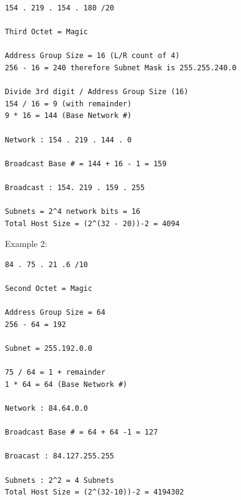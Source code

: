 \begin{lstlisting}
154 . 219 . 154 . 180 /20

Third Octet = Magic

Address Group Size = 16 (L/R count of 4)
256 - 16 = 240 therefore Subnet Mask is 255.255.240.0

Divide 3rd digit / Address Group Size (16)
154 / 16 = 9 (with remainder)
9 * 16 = 144 (Base Network #)

Network : 154 . 219 . 144 . 0

Broadcast Base # = 144 + 16 - 1 = 159

Broadcast : 154. 219 . 159 . 255

Subnets = 2^4 network bits = 16
Total Host Size = (2^(32 - 20))-2 = 4094
\end{lstlisting}

Example 2:

\begin{lstlisting}
84 . 75 . 21 .6 /10

Second Octet = Magic

Address Group Size = 64
256 - 64 = 192

Subnet = 255.192.0.0

75 / 64 = 1 + remainder
1 * 64 = 64 (Base Network #)

Network : 84.64.0.0

Broadcast Base # = 64 + 64 -1 = 127

Broacast : 84.127.255.255

Subnets : 2^2 = 4 Subnets
Total Host Size = (2^(32-10))-2 = 4194302
\end{lstlisting}
